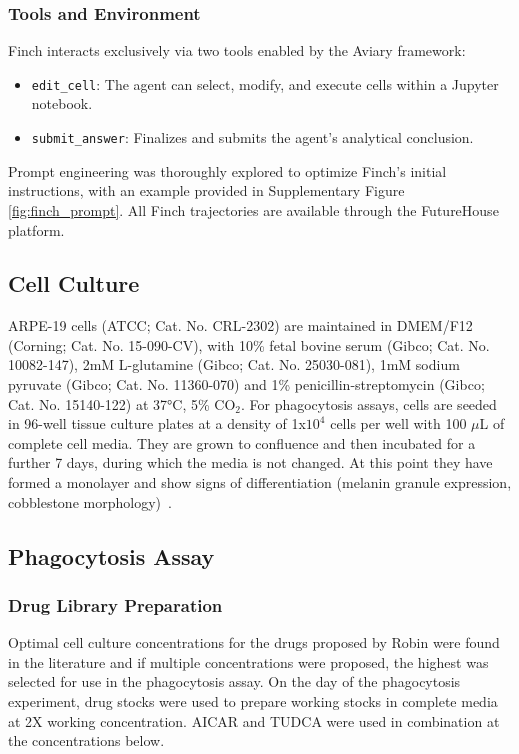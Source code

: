 \documentclass{article}
\begin{document}
\subsubsection{Tools and Environment}

Finch interacts exclusively via two tools enabled by the Aviary framework:
\begin{itemize}
\item \texttt{edit\_cell}: The agent can select, modify, and execute cells within a Jupyter notebook.
\item \texttt{submit\_answer}: Finalizes and submits the agent's analytical conclusion.
\end{itemize}

Prompt engineering was thoroughly explored to optimize Finch’s initial instructions, with an example provided in Supplementary Figure \ref{fig:finch_prompt}. All Finch trajectories are available through the FutureHouse platform.

\subsection{Cell Culture}

ARPE-19 cells (ATCC; Cat. No. CRL-2302) are maintained in DMEM/F12 (Corning; Cat. No. 15-090-CV), with 10\% fetal bovine serum (Gibco; Cat. No. 10082-147), 2mM L-glutamine (Gibco; Cat. No. 25030-081), 1mM sodium pyruvate (Gibco; Cat. No. 11360-070) and 1\% penicillin-streptomycin (Gibco; Cat. No. 15140-122) at 37°C, 5\% CO$_{2}$. For phagocytosis assays, cells are seeded in 96-well tissue culture plates at a density of 1x$10^{4}$ cells per well with 100 $\mu$L of complete cell media. They are grown to confluence and then incubated for a further 7 days, during which the media is not changed. At this point they have formed a monolayer and show signs of differentiation (melanin granule expression, cobblestone morphology)~\cite{DUNN_AOTAKI-KEEN_PUTKEY_HJELMELAND_1996}. 

\subsection{Phagocytosis Assay}

\subsubsection{Drug Library Preparation}

Optimal cell culture concentrations for the drugs proposed by Robin were found in the literature and if multiple concentrations were proposed, the highest was selected for use in the phagocytosis assay. On the day of the phagocytosis experiment, drug stocks were used to prepare working stocks in complete media at 2X working concentration. AICAR and TUDCA were used in combination at the concentrations below. 
\end{document}
